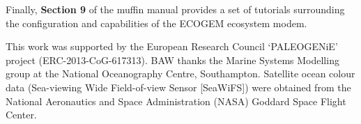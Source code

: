 \documentclass[gmd, manuscript]{copernicus}
\begin{document}
{\noindent Finally, \textbf{Section 9} of the muffin manual provides a set of tutorials surrounding the configuration and capabilities of the ECOGEM ecosystem modem.







\begin{acknowledgements}
This work was supported by the European Research Council `PALEOGENiE' project (ERC-2013-CoG-617313). BAW thanks the Marine Systems Modelling group at the National Oceanography Centre, Southampton. Satellite ocean colour data (Sea-viewing Wide Field-of-view Sensor [SeaWiFS]) were obtained from the National Aeronautics and Space Administration (NASA) Goddard Space Flight Center.
\end{acknowledgements}




\clearpage











}
\end{document}
